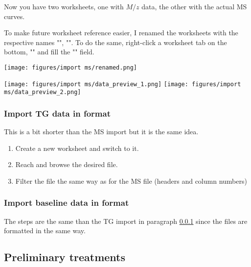 \documentclass[a4paper, 11pt, raggedright, parskip, sans, colorful]{tufte-style-article}
\begin{document}
Now you have two worksheets, one with $M/z$ data, the other with the actual MS curves.

To make future worksheet reference easier, I renamed the worksheets with the respective names "", "". To do the same, right-click a worksheet tab on the bottom, "" and fill the "" field.

\texttt{[image: figures/import ms/renamed.png]}

\smallskip

\begin{wide}
\texttt{[image: figures/import ms/data\_preview\_1.png]}
\hfill
\texttt{[image: figures/import ms/data\_preview\_2.png]}
\end{wide}

\subsubsection{Import TG data in  format}
\label{subsubsec:import_tg}

This is a bit shorter than the MS import but it is the same idea.

\begin{enumerate}

\item Create a new worksheet and switch to it.

\item Reach  and browse the desired file.

\item Filter the file the same way as for the MS file (headers and column numbers)
\end{enumerate}	


\subsubsection{Import baseline data in  format}

The steps are the same than the TG import in paragraph \ref{subsubsec:import_tg} since the files are formatted in the same way.


\subsection{Preliminary treatments}
\end{document}
